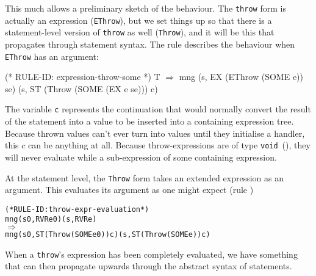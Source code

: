 \documentclass[11pt]{article}
\begin{document}
  This much
allows a preliminary sketch of the behaviour.  The \texttt{throw} form
is actually an expression (\texttt{EThrow}), but we set things up so
that there is a statement-level version of \texttt{throw} as well
(\texttt{Throw}), and it will be this that propagates through
statement syntax.  The rule  describes
the behaviour when \texttt{EThrow} has an argument:
%
\begin{stdrule}
(* RULE-ID: expression-throw-some *)
     T
   \(\Rightarrow\)
     mng (s, EX (EThrow (SOME e)) se)
         (s, ST (Throw (SOME (EX e se))) c)
\end{stdrule}
The variable \texttt{c} represents the continuation that would
normally convert the result of the statement into a value to be
inserted into a containing expression tree.  Because thrown values
can't ever turn into values until they initialise a handler, this $c$
can be anything at all.  Because throw-expressions are of type
\texttt{void}~(\cite[\S15,p1]{cpp-standard-iso14882}), they will never
evaluate while a sub-expression of some containing expression.

At the statement level, the \texttt{Throw} form takes an extended
expression as an argument.  This evaluates its argument as one might
expect (rule )
\begin{center}
\begin{minipage}{\textwidth}
\begin{alltt}
(* RULE-ID: throw-expr-evaluation *)
     mng (s0, RVR e0) (s, RVR e)
   \(\Rightarrow\)
     mng (s0, ST (Throw (SOME e0)) c) (s, ST (Throw (SOME e)) c)
\end{alltt}
\end{minipage}
\end{center}

When a \texttt{throw}'s expression has been completely evaluated, we
have something that can then propagate upwards through the abstract
syntax of statements.
\end{document}
